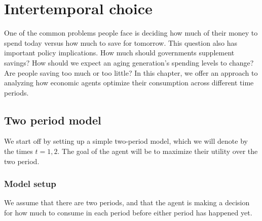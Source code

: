 \chapter{Intertemporal choice}

One of the common problems people face is deciding how much of their money to spend today versus how much to save for tomorrow. This question also has important policy implications. How much should governments supplement savings? How should we expect an aging generation's spending levels to change? Are people saving too much or too little? In this chapter, we offer an approach to analyzing how economic agents optimize their consumption across different time periods.

\section{Two period model}
We start off by setting up a simple two-period model, which we will denote by the times $t = 1, 2$. The goal of the agent will be to maximize their utility over the two period. 

\subsection*{Model setup}
We assume that there are two periods, and that the agent is making a decision for how much to consume in each period before either period has happened yet. 

